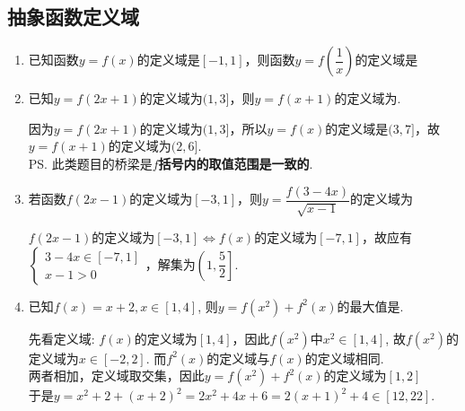 \subsection*{抽象函数定义域}
\begin{enumerate}
    \item 已知函数$y = f(x)$的定义域是$[-1, 1]$，则函数$y = f\left(\dfrac{1}{x}\right)$的定义域是 \blkda[3]{$(-\infty, -1] \cup [1, +\infty)$}
    \item 已知$y = f(2x+1)$的定义域为$(1, 3]$，则$y = f(x+1)$的定义域为\blkda{$(2, 6]$}. 
    \begin{jieda}
        因为$y = f(2x+1)$的定义域为$(1, 3]$，所以$y = f(x)$的定义域是$(3,7]$，故$y = f(x+1)$的定义域为$(2, 6]$. \\
        \ps 此类题目的桥梁是\textbf{$f$括号内的取值范围是一致的}.
    \end{jieda}
    \item 若函数$f(2x-1)$的定义域为$[-3, 1]$，则$y = \dfrac{f(3-4x)}{\sqrt{x-1}}$的定义域为\blkda{$\left(1, \dfrac{5}{2}\right]$}
    \begin{jieda}
        $f(2x-1)$的定义域为$[-3, 1] \Longleftrightarrow f(x)$的定义域为$[-7, 1]$，故应有$\left\{\begin{array}{l}
             3-4x \in [-7, 1] \\
             x - 1 > 0
        \end{array}\right.$，解集为$\left(1, \dfrac{5}{2}\right]$.
    \end{jieda}
    \item 已知$f(x)=x+2, x\in[1,4]$, 则$y=f(x^2)+f^2(x)$的最大值是. 
    \begin{jieda}
    先看定义域: $f(x)$的定义域为$[1,4]$，因此$f(x^2)$中$x^2\in[1,4]$, 故$f(x^2)$的定义域为$x\in[-2,2]$. 而$f^2(x)$的定义域与$f(x)$的定义域相同.\\
    两者相加，定义域取交集，因此$y=f(x^2)+f^2(x)$的定义域为$[1, 2]$ \\
    于是$y=x^2+2+(x+2)^2=2x^2+4x+6=2(x+1)^2+4\in[12,22]$. 
    \end{jieda}
\end{enumerate}

